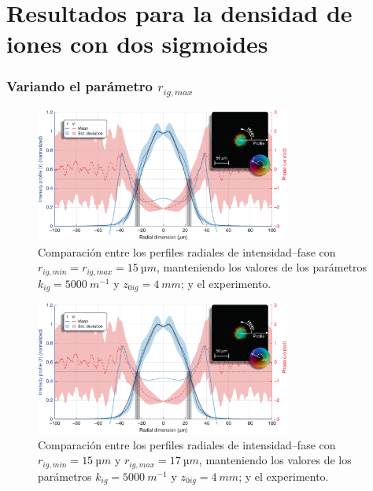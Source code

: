\chapter{Resultados para la densidad de iones con dos sigmoides}\label{anx:2}
\subsection*{Variando el parámetro $r_{ig,max}$}

\begin{figure}[htbp]
  \centering
  \includegraphics[width=0.75\textwidth]{Figuras/anx_cmp_51.png}
  \caption*{Comparación entre los perfiles radiales de intensidad--fase con $r_{ig,min}=r_{ig,max}=\qty{15}{µm}$, manteniendo los valores de los parámetros $k_{ig}=\qty{5000}{m^{-1}}$ y $z_{0ig}=\qty{4}{mm}$; y el experimento.}
\end{figure}

\begin{figure}[htbp]
  \centering
  \includegraphics[width=0.75\textwidth]{Figuras/anx_cmp_52.png}
  \caption*{Comparación entre los perfiles radiales de intensidad--fase con $r_{ig,min}=\qty{15}{µm}$ y $r_{ig,max}=\qty{17}{µm}$, manteniendo los valores de los parámetros $k_{ig}=\qty{5000}{m^{-1}}$ y $z_{0ig}=\qty{4}{mm}$; y el experimento.}
\end{figure}

